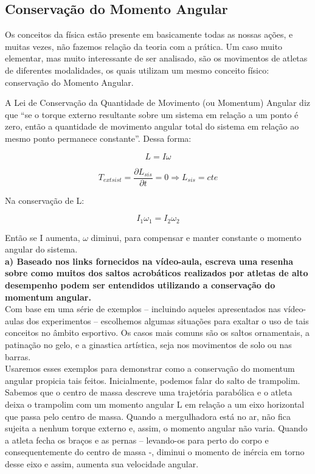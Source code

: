 \subsection{Conservação do Momento Angular}

Os conceitos da física estão presente em basicamente todas as nossas ações, e muitas vezes, não fazemos relação da teoria com a prática. Um caso muito elementar, mas muito interessante de ser analisado, são os movimentos de atletas de diferentes modalidades, os quais utilizam um mesmo conceito físico:  conservação do Momento Angular.

A Lei de Conservação da Quantidade de Movimento (ou Momentum) Angular diz que “se o torque externo resultante sobre um sistema em relação a um ponto é zero, então a quantidade de movimento angular total do sistema em relação ao mesmo ponto permanece constante”. Dessa forma: 

\[L = I  \omega\]

\[T_{ext sist} = \frac{\partial L_{sis}}{\partial t} = 0 \Rightarrow L_{sis} = cte\]

Na conservação de L: 

\[I_1 \omega _1 = I_2 \omega _2 \]

Então se I aumenta, $\omega$ diminui, para compensar e manter constante o momento angular do sistema.\\
 
\textbf{a) Baseado nos links fornecidos na vídeo-aula, escreva uma resenha sobre como muitos dos saltos acrobáticos realizados por atletas de alto desempenho podem ser entendidos utilizando a conservação do momentum angular.}\\

Com base em uma série de exemplos – incluindo aqueles apresentados nas vídeo-aulas dos experimentos – escolhemos algumas situações para exaltar o uso de tais conceitos no âmbito esportivo. Os casos mais comuns são os saltos ornamentais, a patinação no gelo, e a ginastica artística, seja nos movimentos de solo ou nas barras.\\

Usaremos esses exemplos para demonstrar como a conservação do momentum angular propicia tais feitos. Inicialmente, podemos falar do salto de trampolim. Sabemos que o centro de massa descreve uma trajetória parabólica e o atleta deixa o trampolim com um momento angular L em relação a um eixo horizontal que passa pelo centro de massa. Quando a mergulhadora está no ar, não fica sujeita a nenhum torque externo e, assim, o momento angular não varia. Quando a atleta fecha os braços e as pernas – levando-os para perto do corpo e consequentemente do centro de massa -, diminui o momento de inércia em torno desse eixo e assim, aumenta sua velocidade angular.\\

